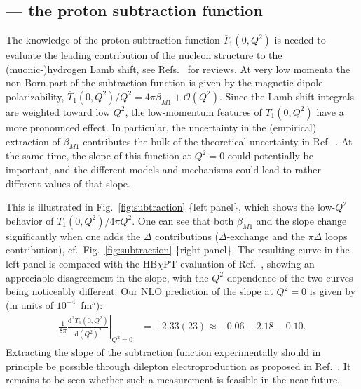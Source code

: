 \documentclass[12pt,preprint,tightenlines,
showpacs,preprintnumbers,amsmath,amssymb,
a4paper,nofootinbib]{revtex4-2}
\def\dd{\mathrm{d}}
\def\ol#1{\overline{#1}}
\begin{document}
\subsection{\boldmath{$\ol{T}_1(0,Q^2)$} --- the proton subtraction function}

The knowledge of the proton subtraction function $\ol{T}_1(0,Q^2)$ is needed
to evaluate the leading contribution of the nucleon structure to the (muonic-)hydrogen
Lamb shift, see Refs.~\cite{Hagelstein:2015egb,Pohl:2013yb,Carlson:2015jba} for reviews.
At very low momenta the non-Born part of the subtraction function is given by the magnetic dipole polarizability, $\ol{T}_1(0,Q^2)/Q^2=4\pi \beta_{M1}+\mathcal{O}(Q^2)$.
Since the Lamb-shift integrals
are weighted toward low $Q^2$, the low-momentum features of $\ol{T}_1(0,Q^2)$ 
have a more pronounced effect. 
In particular, the uncertainty in the (empirical) extraction of $\beta_{M1}$ contributes the
bulk of the theoretical uncertainty in Ref.~\cite{Birse:2012eb}. At the same time, the slope
of this function at $Q^2=0$ could potentially be important, and the different models and
mechanisms could lead to rather different values of that slope. 

This is illustrated in Fig.~\ref{fig:subtraction} \{left panel\}, which shows the low-$Q^2$ behavior of $\ol{T}_1(0,Q^2)/4\pi Q^2$.
One can see that both $\beta_{M1}$ and the slope change significantly when one adds the $\Delta$ contributions ($\Delta$-exchange
and the $\pi\Delta$ loops contribution), cf.\ Fig.~\ref{fig:subtraction} \{right panel\}.
The resulting curve in the left panel is compared with the HB$\chi$PT evaluation of Ref.~\cite{Birse:2012eb}, showing an appreciable disagreement in the slope,
with the $Q^2$ dependence of the two curves being noticeably different.
Our NLO prediction of the slope at $Q^2=0$ is given by (in units of $10^{-4}$~fm$^5$):
\begin{align}
\frac{1}{8\pi}\left.\frac{\dd^2  \ol{T}_1(0,Q^2)}{\dd (Q^2)^2}\right|_{Q^2=0}&=-2.33(23)\approx -0.06-2.18-0.10.
\end{align}
Extracting the slope
of the subtraction function experimentally should in principle be possible through dilepton electroproduction as proposed in Ref.~\cite{Pauk:2020gjv}. It remains to be seen
whether such a measurement is feasible in the near future.
\end{document}

